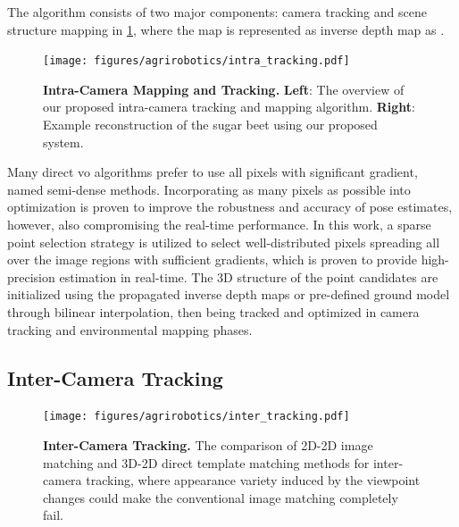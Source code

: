 The algorithm consists of two major components: camera tracking and scene structure mapping in \ref{fig:agrirobotics_intratracking}, where the map is represented as inverse depth map as \cite{civera2008inverse}. 

\begin{figure}[t]
    \centering
    \texttt{[image: figures/agrirobotics/intra\_tracking.pdf]}
    \caption[Intra-Camera Mapping and Tracking]{\textbf{Intra-Camera Mapping and Tracking.} \textbf{Left}: The overview of our proposed intra-camera tracking and mapping algorithm. \textbf{Right}: Example reconstruction of the sugar beet using our proposed system. 
	\label{fig:agrirobotics_intratracking}}
\end{figure}

Many direct \acrshort{vo} algorithms prefer to use all pixels with significant gradient, named semi-dense methods. 
Incorporating as many pixels as possible into optimization is proven to improve the robustness and accuracy of pose estimates, however, also compromising the real-time performance. 
In this work, a sparse point selection strategy \cite{engel2018direct} is utilized to select well-distributed pixels spreading all over the image regions with sufficient gradients, which is proven to provide high-precision estimation in real-time. 
The 3D structure of the point candidates are initialized using the propagated inverse depth maps or pre-defined ground model through bilinear interpolation, then being tracked and optimized in camera tracking and environmental mapping phases.

\subsection{Inter-Camera Tracking}

\begin{figure}[t]
    \centering
    \texttt{[image: figures/agrirobotics/inter\_tracking.pdf]}
    \caption[Inter-Camera Tracking]{\textbf{Inter-Camera Tracking.} The comparison of 2D-2D image matching and 3D-2D direct template matching methods for inter-camera tracking, where appearance variety induced by the viewpoint changes could make the conventional image matching completely fail.
	\label{fig:agrirobotics_intertracking}}
\end{figure}

